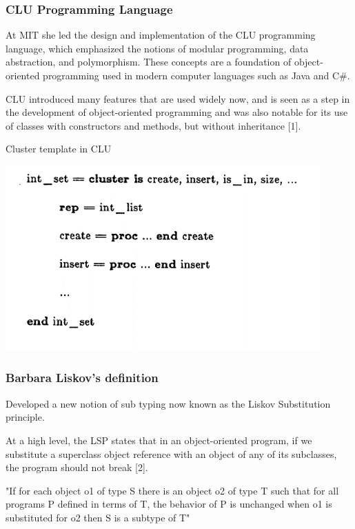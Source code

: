 \documentclass{beamer}
\begin{document}
\begin{frame}
\frametitle{CLU Programming Language}

At MIT she led the design and implementation of the CLU programming language, which emphasized the notions of modular programming, data abstraction, and polymorphism. These concepts are a foundation of object-oriented programming used in modern computer languages such as Java and C\#.

\vspace{5mm}

CLU introduced many features that are used widely now, and is seen as a step in the development of object-oriented programming and was also notable for its use of classes with constructors and methods, but without inheritance [1].

\end{frame}
\begin{frame}{Cluster template in CLU}

\includegraphics{cluster.png}
    
\end{frame}


\begin{frame}
\frametitle{Barbara Liskov's definition}

Developed a new notion of sub typing now known as the Liskov Substitution principle.

\vspace{5mm} %

At a high level, the LSP states that in an object-oriented program, if we substitute a superclass object reference with an object of any of its subclasses, the program should not break [2].\\

\vspace{5 mm}

"If for each object o1 of type S there is an object o2 of type T such that for all programs P defined in terms of T, the behavior of P is unchanged when o1 is substituted for o2 then S is a subtype of T"


\end{frame}
\end{document}
